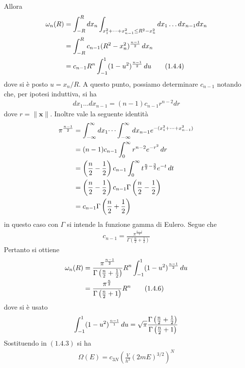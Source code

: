 \documentclass{article}
\begin{document}
Allora
\begin{align}
    \omega_n(R) &= \int_{-R}^{R}dx_n\int_{x^2_1 + \dots + x^2_{n - 1} \leq R^2 - x^2_n}dx_1 \dots dx_{n - 1}dx_n \notag \\
    &= \int_{-R}^R c_{n - 1}(R^2 - x^2_n)^{\frac{n - 1}{2}} \, dx_n \notag \\
    &= c_{n - 1}R^n\int_{-1}^1(1 - u^2)^{\frac{n - 1}{2}} \, du \tag{1.4.4}
\end{align}
dove si è posto $u = x_n/R$. A questo punto, possiamo determinare $c_{n - 1}$ notando che, per ipotesi induttiva, si ha
\begin{align*}
    dx_1 \dots dx_{n - 1} = (n - 1)c_{n - 1}r^{n - 2}dr
\end{align*}
dove $r = \|\mathbf{x}\|$. Inoltre vale la seguente identità
\begin{align}
    \pi^{\frac{n - 1}{2}} &= \int_{-\infty}^\infty dx_1 \dots \int_{-\infty}^\infty dx_{n - 1}e^{-(x^2_1 + \dots + x^2_{n - 1})} \notag \\
    &= (n - 1)c_{n - 1}\int_{0}^\infty r^{n - 2}e^{-r^2} \, dr \notag \\
    &= \left(\frac{n}{2} - \frac{1}{2}\right)c_{n - 1}\int_0^\infty t^{\frac{n}{2} - \frac{3}{2}}e^{-t} \, dt \notag \\
    &= \left(\frac{n}{2} - \frac{1}{2}\right)c_{n - 1}\Gamma\left(\frac{n}{2} - \frac{1}{2}\right) \notag \\
    &= c_{n - 1}\Gamma\left(\frac{n}{2} + \frac{1}{2}\right) \notag
\end{align}
in questo caso con $\Gamma$ si intende la funzione gamma di Eulero. Segue che
\begin{gather}
    c_{n - 1} = \frac{\pi^{\frac{n - 1}{2}}}{\Gamma\left(\frac{n}{2} + \frac{1}{2}\right)} \tag{1.4.5}
\end{gather}
Pertanto si ottiene
\begin{align}
    \omega_n(R) &= \frac{\pi^{\frac{n - 1}{2}}}{\Gamma\left(\frac{n}{2} + \frac{1}{2}\right)}R^n\int_{-1}^1(1 - u^2)^{\frac{n - 1}{2}} \, du \notag \\
    &= \frac{\pi^{\frac{n}{2}}}{\Gamma\left(\frac{n}{2} + 1\right)}R^n \tag{1.4.6}
\end{align}
dove si è usato
\begin{align}
    \int_{-1}^1 (1 - u^2)^{\frac{n - 1}{1}} \, du = \sqrt{\pi}\frac{\Gamma\left(\frac{n}{2} + \frac{1}{2}\right)}{\Gamma\left(\frac{n}{2} + 1\right)} \notag
\end{align}
Sostituendo in $(1.4.3)$ si ha
\begin{gather}
    \Omega(E) = c_{3N}\left(\frac{V}{h^3}(2mE)^{3/2}\right)^N \tag{1.4.6}
\end{gather}
\end{document}
